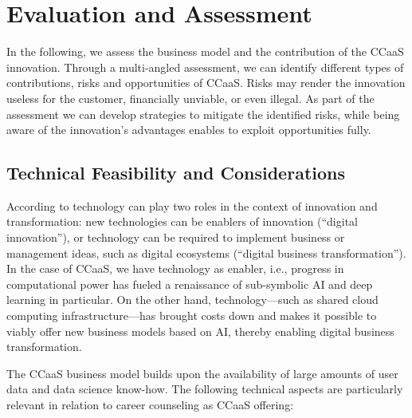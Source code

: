 \section{Evaluation and Assessment}
\label{sec:evaluation}

In the following, we assess the business model and the contribution of the CCaaS innovation. Through a
multi-angled assessment, we can identify different types of contributions, risks and opportunities of CCaaS.
Risks may render the innovation useless for the customer, financially unviable, or even illegal. As part of
the assessment we can develop strategies to mitigate the identified risks, while being aware of the innovation's
advantages enables to exploit opportunities fully.

\subsection{Technical Feasibility and Considerations}

According to \cite{dornbergerDigitalInnovationDigital2021} technology can play two roles in the context of innovation
and transformation: new technologies can be enablers of innovation (``digital innovation''), or technology can be 
required to implement business or management ideas, such as digital ecosystems (``digital business transformation'').
In the case of CCaaS, we have technology as enabler, i.e., progress in computational power has fueled a renaissance
of sub-symbolic AI and deep learning in particular. On the other hand, technology---such as shared cloud computing
infrastructure---has brought costs down and makes it possible to viably offer new business models based on AI,
thereby enabling digital business transformation.

The CCaaS business model builds upon the availability of large amounts of user data and data science know-how.
The following technical aspects are particularly relevant in relation to career counseling as CCaaS offering:

